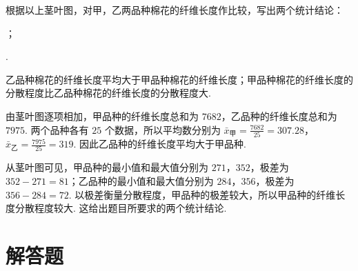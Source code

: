 \begin{problem}
根据以上茎叶图，对甲，乙两品种棉花的纤维长度作比较，写出两个统计结论：

\begin{circlelist}
\item\fillinblank{}；
\item\fillinblank{}.
\end{circlelist}
\end{problem}

\begin{answer}
乙品种棉花的纤维长度平均大于甲品种棉花的纤维长度；甲品种棉花的纤维长度的分散程度比乙品种棉花的纤维长度的分散程度大.
\end{answer}

\begin{solution}
由茎叶图逐项相加，甲品种的纤维长度总和为 \(7682\)，乙品种的纤维长度总和为 \(7975\). 两个品种各有 \(25\) 个数据，所以平均数分别为
\(\bar{x}_{\text{甲}}=\frac{7682}{25}=307.28\)，\(\bar{x}_{\text{乙}}=\frac{7975}{25}=319\).
因此乙品种的纤维长度平均大于甲品种.

从茎叶图可见，甲品种的最小值和最大值分别为 \(271\)，\(352\)，极差为 \(352-271=81\)；乙品种的最小值和最大值分别为 \(284\)，\(356\)，极差为 \(356-284=72\). 以极差衡量分散程度，甲品种的极差较大，所以甲品种的纤维长度分散程度较大. 这给出题目所要求的两个统计结论.
\end{solution}

\section{解答题}

